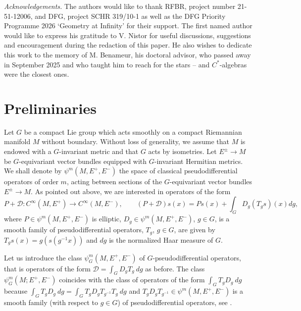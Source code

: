 \documentclass[11pt,a4paper]{amsart}
\newcommand{\maD}{\mathcal D}
\newcommand\<{\langle}
\renewcommand\>{\rangle}
\theoremstyle{definition}
\begin{document}
\medskip

\noindent
{\em{Acknowledgements.}} The authors would like to thank RFBR,  project number 21-51-12006, and DFG, project SCHR 319/10-1 as well as the DFG Priority Programme 2026 `Geometry at Infinity'   
    for their support.
 The first named author would like to express his gratitude to V. Nistor for useful discussions, suggestions and encouragement during the redaction of this paper.   
 He also wishes to dedicate this work to the memory of M. Benameur, his doctoral advisor, who passed away in September 2025 and who taught him to reach for the stars -- and $C^*$-algebras were the closest ones.  
  


\section{Preliminaries}\label{sec.preliminaries}

Let $G$ be a compact Lie group which acts smoothly on a compact Riemannian manifold $M$ without boundary. 
Without loss of generality, we assume that $M$ is endowed with a $G$-invariant metric and that $G$ acts by isometries.
Let $E^\pm \rightarrow M$ be $G$-equivariant vector bundles equipped with $G$-invariant Hermitian metrics.
We shall denote by $\psi^m(M,E^+,E^-)$ the space of  
classical pseudodifferential operators of order $m$, acting between
sections of the $G$-equivariant vector bundles $E^\pm \rightarrow M$.
As pointed out above, we are interested in operators of the form
\begin{equation*}
P + \maD : C^\infty(M,E^+) \rightarrow C^\infty(M,E^-),\qquad (P + \maD) s(x)=Ps(x) + \int_G D_g (T_gs) (x) dg,
\end{equation*}
where $P \in \psi^m(M,E^+,E^-)$ is elliptic, $D_g \in \psi^m(M,E^+,E^-)$, $g\in G$, is a smooth family of pseudodifferential operators, $T_g$, $g\in G$,  are given by 
$T_gs(x)=g(s(g^{-1}x))$ and $dg$ is the normalized Haar measure of $G$.

Let us introduce the class $\psi^m_G(M,E^+,E^-)$ of $G$-pseudodifferential operators, 
that is operators of the form $\maD = \int_G D_g T_g\ dg$ as before.
The class $\psi^m_G(M;E^+,E^-)$ coincides with 
the class of operators of the form
$\int_G T_g D_g\ dg$ because $\int_G T_gD_g\ dg = \int_G T_g D_g T_{g^{-1}} T_g\ dg$ and 
$T_g D_g T_{g^{-1}} \in \psi^m(M,E^+,E^-)$ is a smooth family 
(with respect to $g\in G$) of pseudodifferential operators,
see \cite{AS1,Sternin.unif}.
\end{document}
